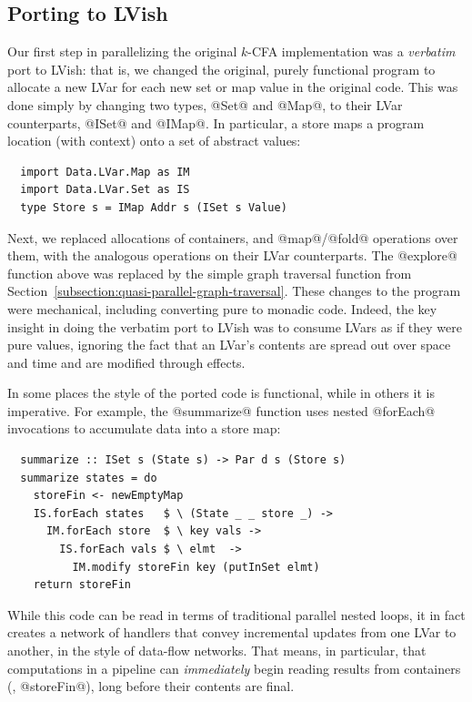 \subsection{Porting to LVish}

Our first step in parallelizing the original $k$-CFA implementation
was a \emph{verbatim} port to LVish: that is, we changed the original,
purely functional program to allocate a new LVar for each new set or
map value in the original code.  This was done simply by changing two
types, @Set@ and @Map@, to their LVar counterparts, @ISet@ and @IMap@.
In particular, a store maps a program location (with context) onto a
set of abstract values:

\singlespacing
\begin{lstlisting}
  import Data.LVar.Map as IM
  import Data.LVar.Set as IS
  type Store s = IMap Addr s (ISet s Value)
\end{lstlisting}
\doublespacing

Next, we replaced allocations of containers, and @map@/@fold@
operations over them, with the analogous operations on their LVar
counterparts.  The @explore@ function above was replaced by the simple
graph traversal function from
Section~\ref{subsection:quasi-parallel-graph-traversal}.  These
changes to the program were mechanical, including converting pure to
monadic code.  Indeed, the key insight in doing the verbatim port to
LVish was to consume LVars as if they were pure values, ignoring the
fact that an LVar's contents are spread out over space and time and
are modified through effects.

In some places the style of the ported code is functional, while in
others it is imperative.  For example, the @summarize@ function uses
nested @forEach@ invocations to accumulate data into a store map:

\singlespacing
\begin{lstlisting}
  summarize :: ISet s (State s) -> Par d s (Store s)
  summarize states = do
    storeFin <- newEmptyMap
    IS.forEach states   $ \ (State _ _ store _) -> 
      IM.forEach store  $ \ key vals -> 
        IS.forEach vals $ \ elmt  -> 
          IM.modify storeFin key (putInSet elmt)
    return storeFin    
\end{lstlisting}
\doublespacing

While this code can be read in terms of traditional parallel nested
loops, it in fact creates a network of handlers that convey
incremental updates from one LVar to another, in the style of
data-flow networks.  That means, in particular, that computations in a
pipeline can \emph{immediately} begin reading results from containers
(\eg, @storeFin@), long before their contents are final.

